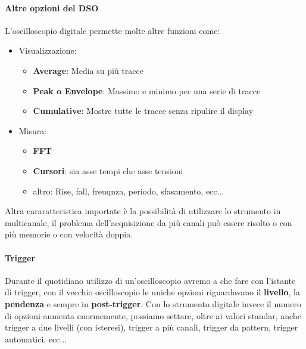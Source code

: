 \documentclass[12pt]{article}
\begin{document}
\paragraph{Altre opzioni del DSO} L'oscilloscopio digitale permette molte altre funzioni come:
\begin{itemize}
  \item Visualizzazione:
  \begin{itemize}
    \item \textbf{Average}: Media su più tracce
    \item \textbf{Peak o Envelope}: Massimo e minimo per una serie di tracce
    \item \textbf{Cumulative}: Mostre tutte le tracce senza ripulire il display
  \end{itemize}
  \item Misura:
  \begin{itemize}
    \item \textbf{FFT}
    \item \textbf{Cursori}: sia asse tempi che asse tensioni
    \item altro: Rise, fall, freuqnza, periodo, sfasamento, ecc...
  \end{itemize}
\end{itemize}

Altra cararatteristica importate è la possibilità di utilizzare lo strumento in multicanale, il problema dell'acquisizione da più canali può essere risolto o con più memorie o con velocità doppia.

\paragraph{Trigger} Durante il quotidiano utilizzo di un'oscilloscopio avremo a che fare con l'istante di trigger, con il vecchio oscilloscopio le uniche opzioni riguardavano il \textbf{livello}, la \textbf{pendenza} e sempre in \textbf{post-trigger}. Con lo strumento digitale invece il numero di opzioni aumenta enormemente, possiamo settare, oltre ai valori standar, anche trigger a due livelli (con isteresi), trigger a più canali, trigger da pattern, trigger automatici, ecc...
\end{document}
